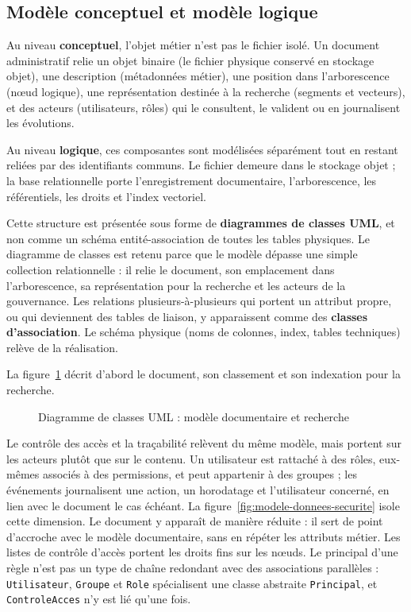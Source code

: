\subsection{Modèle conceptuel et modèle logique}

Au niveau \textbf{conceptuel}, l'objet métier n'est pas le fichier isolé. Un document administratif relie un objet binaire (le fichier physique conservé en stockage objet), une description (métadonnées métier), une position dans l'arborescence (nœud logique), une représentation destinée à la recherche (segments et vecteurs), et des acteurs (utilisateurs, rôles) qui le consultent, le valident ou en journalisent les évolutions.

Au niveau \textbf{logique}, ces composantes sont modélisées séparément tout en restant reliées par des identifiants communs. Le fichier demeure dans le stockage objet ; la base relationnelle porte l'enregistrement documentaire, l'arborescence, les référentiels, les droits et l'index vectoriel.

Cette structure est présentée sous forme de \textbf{diagrammes de classes UML}, et non comme un schéma entité-association de toutes les tables physiques. Le diagramme de classes est retenu parce que le modèle dépasse une simple collection relationnelle : il relie le document, son emplacement dans l'arborescence, sa représentation pour la recherche et les acteurs de la gouvernance. Les relations plusieurs-à-plusieurs qui portent un attribut propre, ou qui deviennent des tables de liaison, y apparaissent comme des \textbf{classes d'association}. Le schéma physique (noms de colonnes, index, tables techniques) relève de la réalisation.

La figure~\ref{fig:modele-donnees-conception} décrit d'abord le document, son classement et son indexation pour la recherche.

\begin{figure}[H]
\centering

\caption{Diagramme de classes UML : modèle documentaire et recherche}
\label{fig:modele-donnees-conception}
\end{figure}

Le contrôle des accès et la traçabilité relèvent du même modèle, mais portent sur les acteurs plutôt que sur le contenu. Un utilisateur est rattaché à des rôles, eux-mêmes associés à des permissions, et peut appartenir à des groupes ; les événements journalisent une action, un horodatage et l'utilisateur concerné, en lien avec le document le cas échéant. La figure~\ref{fig:modele-donnees-securite} isole cette dimension. Le document y apparaît de manière réduite : il sert de point d'accroche avec le modèle documentaire, sans en répéter les attributs métier. Les listes de contrôle d'accès portent les droits fins sur les nœuds. Le principal d'une règle n'est pas un type de chaîne redondant avec des associations parallèles : \texttt{Utilisateur}, \texttt{Groupe} et \texttt{Role} spécialisent une classe abstraite \texttt{Principal}, et \texttt{ControleAcces} n'y est lié qu'une fois.

